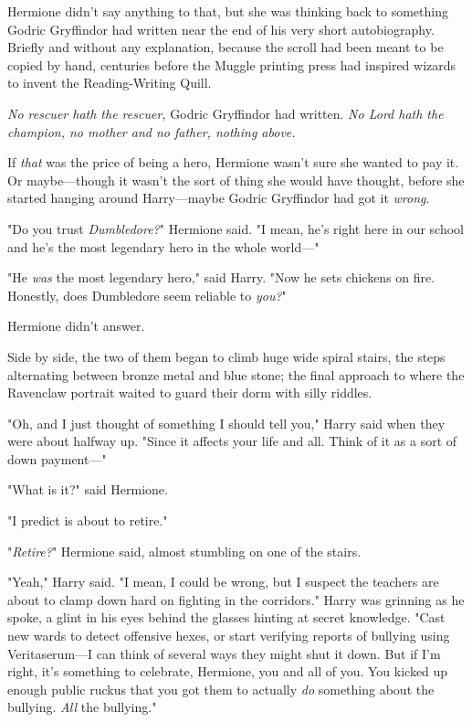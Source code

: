 Hermione didn't say anything to that, but she was thinking back to something
Godric Gryffindor had written near the end of his very short autobiography.
Briefly and without any explanation, because the scroll had been meant to be
copied by hand, centuries before the Muggle printing press had inspired wizards
to invent the Reading-Writing Quill.

\emph{No rescuer hath the rescuer,} Godric Gryffindor had written. \emph{No
Lord hath the champion, no mother and no father, nothing above.}

If \emph{that} was the price of being a hero, Hermione wasn't sure she wanted
to pay it. Or maybe---though it wasn't the sort of thing she would have
thought, before she started hanging around Harry---maybe Godric Gryffindor had
got it \emph{wrong}.

"Do you trust \emph{Dumbledore?}" Hermione said. "I mean, he's right here in
our school and he's the most legendary hero in the whole world---"

"He \emph{was} the most legendary hero," said Harry. "Now he sets chickens on
fire. Honestly, does Dumbledore seem reliable to \emph{you?}"

Hermione didn't answer.

Side by side, the two of them began to climb huge wide spiral stairs, the steps
alternating between bronze metal and blue stone; the final approach to where
the Ravenclaw portrait waited to guard their dorm with silly riddles.

"Oh, and I just thought of something I should tell you," Harry said when they
were about halfway up. "Since it affects your life and all. Think of it as a
sort of down payment---"

"What is it?" said Hermione.

"I predict \SPHEW is about to retire."

"\emph{Retire?}" Hermione said, almost stumbling on one of the stairs.

"Yeah," Harry said. "I mean, I could be wrong, but I suspect the teachers are
about to clamp down hard on fighting in the corridors." Harry was grinning as
he spoke, a glint in his eyes behind the glasses hinting at secret knowledge.
"Cast new wards to detect offensive hexes, or start verifying reports of
bullying using Veritaserum---I can think of several ways they might shut it
down. But if I'm right, it's something to celebrate, Hermione, you and all of
you. You kicked up enough public ruckus that you got them to actually \emph{do}
something about the bullying. \emph{All} the bullying."


